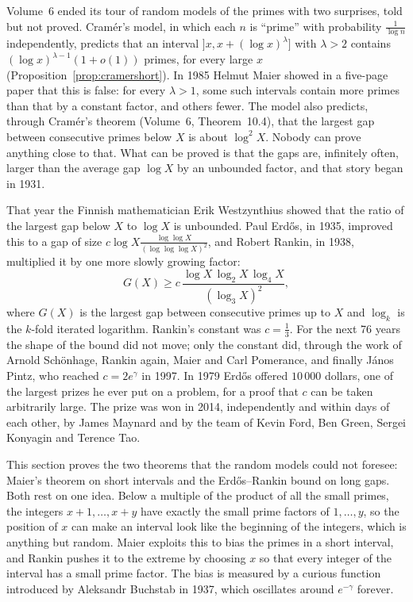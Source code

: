 Volume~6 ended its tour of random models of the primes with two surprises, told but not proved. Cram\'er's model, in which each $n$ is ``prime'' with probability $\frac1{\log n}$ independently, predicts that an interval $]x,x+(\log x)^\lambda]$ with $\lambda>2$ contains $(\log x)^{\lambda-1}(1+o(1))$ primes, for every large $x$ (Proposition~\ref{prop:cramershort}). In 1985 Helmut Maier showed in a five-page paper that this is false: for every $\lambda>1$, some such intervals contain more primes than that by a constant factor, and others fewer. The model also predicts, through Cramér's theorem (Volume~6, Theorem~10.4), that the largest gap between consecutive primes below $X$ is about $\log^2X$. Nobody can prove anything close to that. What can be proved is that the gaps are, infinitely often, larger than the average gap $\log X$ by an unbounded factor, and that story began in 1931.

That year the Finnish mathematician Erik Westzynthius showed that the ratio of the largest gap below $X$ to $\log X$ is unbounded. Paul Erd\H{o}s, in 1935, improved this to a gap of size $c\log X\frac{\log\log X}{(\log\log\log X)^2}$, and Robert Rankin, in 1938, multiplied it by one more slowly growing factor:
\[
G(X)\ge c\,\frac{\log X\,\log_2X\,\log_4X}{(\log_3X)^2},
\]
where $G(X)$ is the largest gap between consecutive primes up to $X$ and $\log_k$ is the $k$-fold iterated logarithm. Rankin's constant was $c=\frac13$. For the next 76 years the shape of the bound did not move; only the constant did, through the work of Arnold Schönhage, Rankin again, Maier and Carl Pomerance, and finally János Pintz, who reached $c=2e^\gamma$ in 1997. In 1979 Erd\H{o}s offered $10\,000$ dollars, one of the largest prizes he ever put on a problem, for a proof that $c$ can be taken arbitrarily large. The prize was won in 2014, independently and within days of each other, by James Maynard and by the team of Kevin Ford, Ben Green, Sergei Konyagin and Terence Tao.

This section proves the two theorems that the random models could not foresee: Maier's theorem on short intervals and the Erd\H{o}s--Rankin bound on long gaps. Both rest on one idea. Below a multiple of the product of all the small primes, the integers $x+1,\dots,x+y$ have exactly the small prime factors of $1,\dots,y$, so the position of $x$ can make an interval look like the beginning of the integers, which is anything but random. Maier exploits this to bias the primes in a short interval, and Rankin pushes it to the extreme by choosing $x$ so that every integer of the interval has a small prime factor. The bias is measured by a curious function introduced by Aleksandr Buchstab in 1937, which oscillates around $e^{-\gamma}$ forever.

